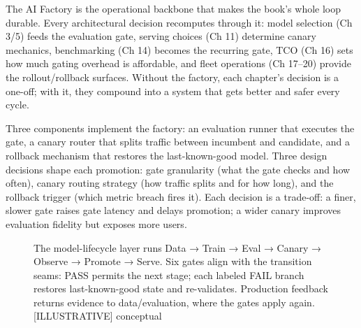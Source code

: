 \label{architecture-consequence}


The AI Factory is the operational backbone that makes the book's whole
loop durable. Every architectural decision recomputes through it: model
selection (Ch 3/5) feeds the evaluation gate, serving choices (Ch 11)
determine canary mechanics, benchmarking (Ch 14) becomes the recurring
gate, TCO (Ch 16) sets how much gating overhead is affordable, and fleet
operations (Ch 17--20) provide the rollout/rollback surfaces. Without
the factory, each chapter's decision is a one-off; with it, they
compound into a system that gets better and safer every cycle.

Three components implement the factory: an evaluation runner that
executes the gate, a canary router that splits traffic between incumbent
and candidate, and a rollback mechanism that restores the
last-known-good model. Three design decisions shape each promotion: gate
granularity (what the gate checks and how often), canary routing
strategy (how traffic splits and for how long), and the rollback trigger
(which metric breach fires it). Each decision is a trade-off: a finer,
slower gate raises gate latency and delays promotion; a wider canary
improves evaluation fidelity but exposes more users.

\begingroup\makeatletter{}\makeatother

\begin{figure}
\centering
{}
\caption[The model lifecycle: data, training, evaluation and promotion]{The model-lifecycle layer runs Data → Train → Eval → Canary → Observe → Promote → Serve. Six gates align with the transition seams: PASS permits the next stage; each labeled FAIL branch restores last-known-good state and re-validates. Production feedback returns evidence to data/evaluation, where the gates apply again. \mbox{{[}ILLUSTRATIVE{]}} conceptual}

\label{fig:21.1}\end{figure}

\endgroup

